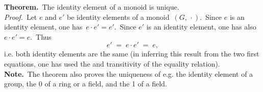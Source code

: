 \documentclass[12pt]{article}
\theoremstyle{definition}
\begin{document}
\textbf{Theorem.}\, The identity element of a monoid is unique.\\

{\em Proof.}\, Let $e$ and $e'$ be identity elements of a monoid \,$(G,\,\cdot)$.\, Since $e$ is an identity element, one has\, $e\!\cdot\!e' = e'$.\, Since $e'$ is an identity element, one has also\, $e\!\cdot\!e' = e$.\, Thus
$$e' \;=\; e\!\cdot\!e' \;=\; e,$$
i.e. both identity elements are the same (in inferring this result from the two first equations, one has used the  and transitivity of the equality relation).\\


\textbf{Note.}\, The theorem also proves the uniqueness of e.g. the identity element of a group, the  0 of a ring or a field, and the  1 of a field.
\end{document}
